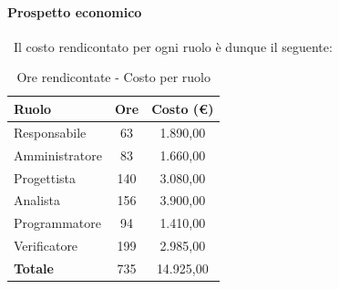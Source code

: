 \documentclass[../PianoProgetto.tex]{subfiles}
\begin{document}
\vfill
	
	\paragraph{Prospetto economico}\
					Il costo rendicontato per ogni ruolo è dunque il seguente:
	\begin{table}[H]
		\centering
		\begin{tabular}{l * {2}{c}}
			\toprule
			\textbf{Ruolo} & \textbf{Ore} & \textbf{Costo (\euro{})} \\
			\midrule
			Responsabile &	63 & 1.890,00 \\
			Amministratore & 83 & 1.660,00 \\
			Progettista & 140 & 3.080,00 \\
			Analista & 156 & 3.900,00 \\
			Programmatore & 94 & 1.410,00 \\
			Verificatore & 199 & 2.985,00 \\
			\midrule		
			\textbf{Totale} & 735 & 14.925,00 \\
			\bottomrule
		\end{tabular}
		\caption{Ore rendicontate - Costo per ruolo}
		\label{tab:rendicontate_costo}
	\end{table}
\vfill
\newpage
\vfill	
	
\end{document}
